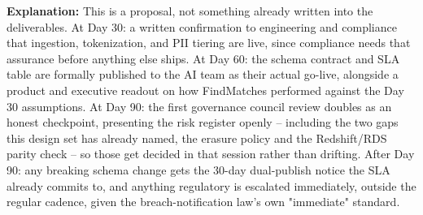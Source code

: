 \documentclass[11pt]{article}
\begin{document}
\textbf{Explanation:} This is a proposal, not something already written into the deliverables. At Day 30: a written confirmation to engineering and compliance that ingestion, tokenization, and PII tiering are live, since compliance needs that assurance before anything else ships. At Day 60: the schema contract and SLA table are formally published to the AI team as their actual go-live, alongside a product and executive readout on how FindMatches performed against the Day 30 assumptions. At Day 90: the first governance council review doubles as an honest checkpoint, presenting the risk register openly -- including the two gaps this design set has already named, the erasure policy and the Redshift/RDS parity check -- so those get decided in that session rather than drifting. After Day 90: any breaking schema change gets the 30-day dual-publish notice the SLA already commits to, and anything regulatory is escalated immediately, outside the regular cadence, given the breach-notification law's own "immediate" standard.
\end{document}
